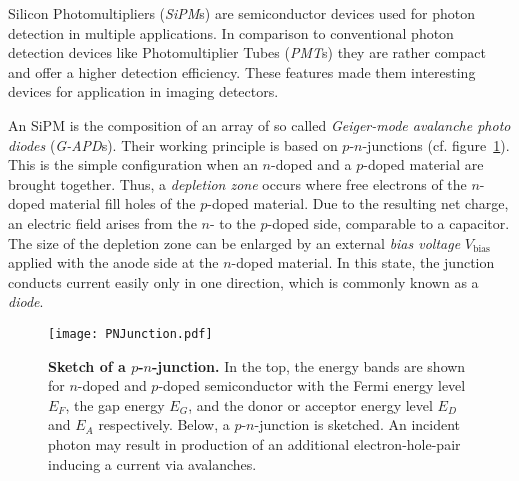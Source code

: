 Silicon Photomultipliers (\textit{SiPM}s) are semiconductor devices used for photon detection in multiple applications. In comparison to conventional photon detection devices like Photomultiplier Tubes (\textit{PMT}s) they are rather compact and offer a higher detection efficiency. These features made them interesting devices for application in imaging detectors.

An SiPM is the composition of an array of so called \textit{Geiger-mode avalanche photo diodes} (\mbox{\textit{G-APD}s}). Their working principle is based on $p$-$n$-junctions (cf. figure~\ref{sipm:pn_junction}). This is the simple configuration when an $n$-doped and a $p$-doped material are brought together. Thus, a \textit{depletion zone} occurs where free electrons of the $n$-doped material fill holes of the $p$-doped material. Due to the resulting net charge, an electric field arises from the $n$- to the $p$-doped side, comparable to a capacitor. The size of the depletion zone can be enlarged by an external \textit{bias voltage} $V_\text{bias}$ applied with the anode side at the $n$-doped material. In this state, the junction conducts current easily only in one direction, which is commonly known as a \textit{diode}. \cite{pn:simon}

\begin{figure}[H]
	\centering
	\texttt{[image: PNJunction.pdf]}
	\caption[Sketch of a $p$-$n$-junction]{\textbf{Sketch of a $p$-$n$-junction.} \cite{iceact:camera} In the top, the energy bands are shown for $n$-doped and $p$-doped semiconductor with the Fermi energy level $E_F$, the gap energy $E_G$, and the donor or acceptor energy level $E_D$ and $E_A$ respectively. Below, a $p$-$n$-junction is sketched. An incident photon may result in production of an additional electron-hole-pair inducing a current via avalanches.}
	\label{sipm:pn_junction}	
\end{figure}

